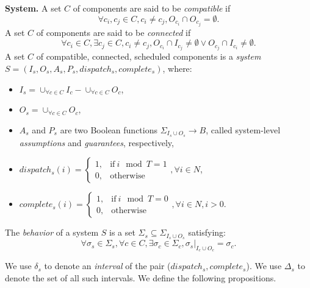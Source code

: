 {\bf System.}
A set $C$ of components are said to be \emph{compatible} if 
\begin{equation*}
	\forall c_i,c_j \in C, c_i\neq c_j, O_{c_i} \cap O_{c_j} = \emptyset.
\end{equation*}
A set $C$ of components are said to be \emph{connected} if
\begin{equation*}
	\forall c_i \in C, \exists c_j \in C, c_i\neq c_j, O_{c_i} \cap I_{c_j} \neq \emptyset \vee O_{c_j} \cap I_{c_i} \neq \emptyset.
\end{equation*}
A set $C$ of compatible, connected, scheduled components is a \emph{system} $S = (I_s, O_s, A_s, P_s, dispatch_s, complete_s)$, where:
\begin{itemize}
	\item $I_s = \cup_{\forall c \in C}I_c -  \cup_{\forall c \in C}O_c$,
	\item $O_s = \cup_{\forall c \in C}O_c$,
	\item $A_s$ and $P_s$ are two Boolean functions $\Sigma_{I_s \cup O_s} \rightarrow B$, called system-level \emph{assumptions} and \emph{guarantees}, respectively,
	\item $dispatch_s (i) = 
	    	\begin{cases}
      		1, & \text{if}\ i \mod T =1 \\
	     	0, & \text{otherwise}
   	 	\end{cases}, \forall i \in N$,
   	\item $complete_s (i) =
   		\begin{cases}
      		1, & \text{if}\ i \mod T = 0 \\
	     	0, & \text{otherwise}
   	 	\end{cases}, \forall i \in N, i > 0$.
\end{itemize}
The \emph{behavior} of a system $S$ is a set $\Sigma_s \subseteq \Sigma_{I_s \cup O_s}$ satisfying: 
\begin{equation*}
	\forall \sigma_s \in \Sigma_s,  \forall c \in C, \exists \sigma_c \in \Sigma_c, \sigma_s|_{I_c \cup O_c} = \sigma_c.
\end{equation*}

We use $\delta_s$ to denote an \emph{interval} of the pair ($dispatch_s, complete_s$). We use $\Delta_s$ to denote the set of all such intervals.
We define the following propositions.

